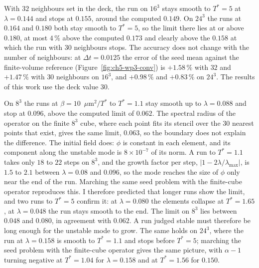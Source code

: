 With $32$ neighbours set in the deck, the run on $16^3$ stays smooth to
$T^*=5$ at $\lambda=0.144$ and stops at $0.155$, around the computed $0.149$.
On $24^3$ the runs at $0.164$ and $0.180$ both stay smooth to $T^*=5$, so the
limit there lies at or above $0.180$, at most $4\,\%$ above the computed
$0.173$ and clearly above the $0.158$ at which the run with $30$ neighbours
stops. The accuracy does not change with the number of neighbours: at
$\Delta t=0.0125$ the error of the seed mean against the finite-volume
reference (Figure~\ref{fig:ch5-wp3-conv}) is $+1.58\,\%$ with $32$ and $+1.47\,\%$
with $30$ neighbours on $16^3$, and $+0.98\,\%$ and $+0.83\,\%$ on $24^3$.
The results of this work use the deck value $30$.

On $8^3$ the runs at $\beta=10$~$\mu$m$^2/T^*$ to $T^*=1.1$ stay smooth up to
$\lambda=0.088$ and stop at $0.096$, above the computed limit of $0.062$. The
spectral radius of the operator on the finite $8^3$ cube, where each point
fits its stencil over the $30$ nearest points that exist, gives the same
limit, $0.063$, so the boundary does not explain the difference. The initial
field does: $\phi$ is constant in each element, and its component along the
unstable mode is $8\times10^{-7}$ of its norm. A run to $T^*=1.1$ takes only
$18$ to $22$ steps on $8^3$, and the growth factor per step,
$|1-2\lambda/\lambda_{\max}|$, is $1.5$ to $2.1$ between $\lambda=0.08$ and
$0.096$, so the mode reaches the size of $\phi$ only near the end of the run.
Marching the same seed problem with the finite-cube operator reproduces this.
I therefore predicted that longer runs show the limit, and two runs to
$T^*=5$ confirm it: at $\lambda=0.080$ the elements collapse at $T^*=1.65$,
at $\lambda=0.048$ the run stays smooth to the end. The limit on $8^3$ lies
between $0.048$ and $0.080$, in agreement with $0.062$. A run judged stable
must therefore be long enough for the unstable mode to grow. The same holds
on $24^3$, where the run at $\lambda=0.158$ is smooth to $T^*=1.1$ and stops
before $T^*=5$; marching the seed problem with the finite-cube operator gives
the same picture, with $\alpha-1$ turning negative at $T^*=1.04$ for
$\lambda=0.158$ and at $T^*=1.56$ for $0.150$.

